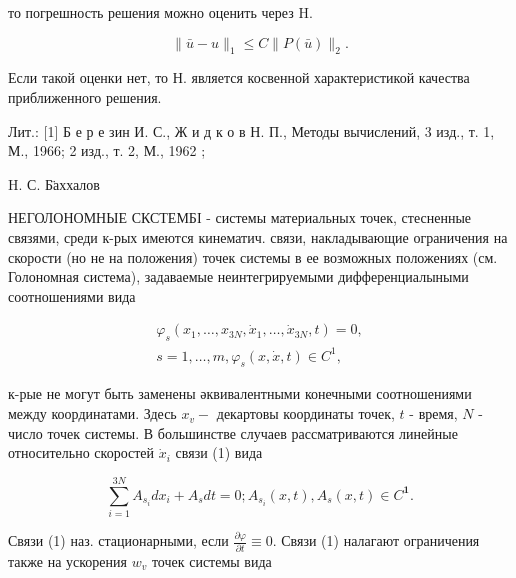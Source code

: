 \documentclass[10pt]{article}
\begin{document}
то погрешность решения можно оценить через $\mathrm{H}$.



\[

\|\bar{u}-u\|_{1} \leqslant C\|P(\bar{u})\|_{2} .

\]



Если такой оценки нет, то Н. является косвенной характеристикой качества приближенного решения.



Лит.: [1] Б е р е зин И. С., Ж и д к о в Н. П., Методы вычислений, 3 изд., т. 1, М., 1966; 2 изд., т. 2, М., 1962 ;



H. С. Б̈аххалов



НЕГОЛОНОМНЫЕ СКСТЕМБІ - системы материальных точек, стесненные связями, среди к-рых имеются кинематич. связи, накладывающие ограничения на скорости (но не на положения) точек системы в ее возможных положениях (см. Голономная система), задаваемые неинтегрируемыми дифференциалыными соотношениями вида



\[

\begin{gathered}

\varphi_{s}\left(x_{1}, \ldots, x_{3 N}, \dot{x}_{1}, \ldots, \dot{x}_{3 N}, t\right)=0, \\

s=1, \ldots, m, \varphi_{s}(x, \dot{x}, t) \in C^{1},

\end{gathered}

\]



к-рые не могут быть заменены әквивалентными конечными соотношениями между координатами. Здесь $x_{v}-$ декартовы координаты точек, $t$ - время, $N$ - число точек системы. В большинстве случаев рассматриваются линейные относительно скоростей $\dot{x}_{i}$ связи (1) вида



\[

\sum_{i=1}^{3 N} A_{s_{i}} d x_{i}+A_{s} d t=0 ; A_{s_{i}}(x, t), A_{s}(x, t) \in C^{\mathbf{1}} .

\]



Связи (1) наз. стационарными, если $\frac{\partial \varphi}{\partial t} \equiv 0$. Связи (1) налагают ограничения также на ускорения $w_{v}$ точек системы вида
\end{document}
